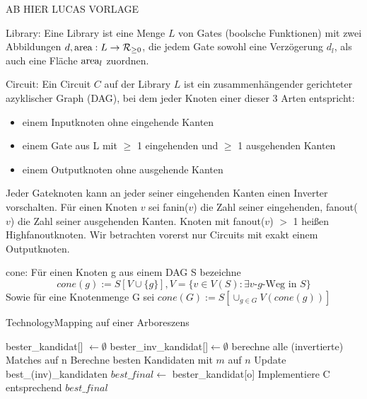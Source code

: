 \documentclass[11pt, a4paper, german]{article}
\begin{document}
AB HIER LUCAS VORLAGE

\begin{definition}{Library: }Eine Library ist eine Menge $L$ von Gates (boolsche Funktionen) mit zwei Abbildungen $d, \text{area}: L \to \mathcal{R}_{\geq 0}$, die jedem Gate sowohl eine Verzögerung $d_l$, als auch eine Fl\"ache $\text{area}_l$ zuordnen.
\end{definition}

\begin{figure}
 
\end{figure}


\begin{definition}{Circuit: }Ein Circuit $C$ auf der Library $L$ ist ein zusammenhängender gerichteter azyklischer Graph (DAG), bei dem jeder Knoten einer dieser 3 Arten entspricht:
 \begin{itemize}
  \item einem Inputknoten ohne eingehende Kanten
  \item einem Gate aus L mit $\geq$ 1 eingehenden und $\geq$ 1 ausgehenden Kanten
  \item einem Outputknoten ohne ausgehende Kanten
 \end{itemize}
 Jeder Gateknoten kann an jeder seiner eingehenden Kanten einen Inverter vorschalten.
 Für einen Knoten $v$ sei fanin($v$) die Zahl seiner eingehenden, fanout($v$) die Zahl seiner ausgehenden Kanten. Knoten mit fanout($v$) $>$ 1 heißen Highfanoutknoten. Wir betrachten vorerst nur Circuits mit exakt einem Outputknoten.
\end{definition}

\begin{definition}{cone: }Für einen Knoten g aus einem DAG S bezeichne \[cone\left(g\right) := S\left[V\cup\lbrace g\rbrace\right], V = \lbrace v \in V(S) : \exists \text{$v$-$g$-Weg in } S\rbrace\]
Sowie für eine Knotenmenge G sei $cone(G) := S\left[\cup_{g \in G}{V(cone(g))}\right]$
 
\end{definition}


\begin{algorithm}[H]
 \LinesNumbered
 \DontPrintSemicolon
 \caption{TechnologyMapping auf einer Arboreszens}

 bester\_kandidat[] $\gets \emptyset$\;
 bester\_inv\_kandidat[]$ \gets \emptyset$\;
 {
   berechne alle (invertierte) Matches auf n\;
   {
      Berechne besten Kandidaten mit $m$ auf $n$\;
      Update best\_(inv)\_kandidaten\;
   }
 }
 $best\_final \gets$ bester\_kandidat[o] \;
 Implementiere C entsprechend $best\_final$\;
\end{algorithm}\ \\




\end{document}
